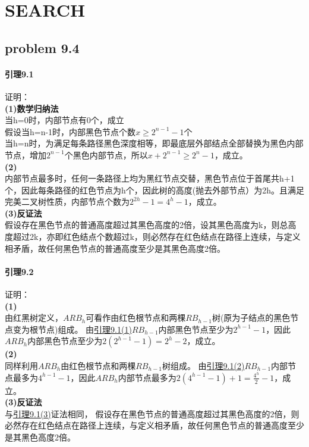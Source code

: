 \documentclass[11pt]{ctexart}
\begin{document}
	\section*{SEARCH}
	\subsection*{problem 9.4}
	\paragraph{引理9.1}证明：\\
	\hypertarget{9.1 (1)}{
	\textbf{(1)数学归纳法}}\\
	当h=0时，内部节点有0个，成立\\
	假设当h=n-1时，内部黑色节点个数$x\geq 2^{n-1}-1$个\\
	当h=n时，为满足每条路径黑色深度相等，即最底层外部结点全部替换为黑色内部节点，增加$2^{n-1}$个黑色内部节点，所以$x+2^{n-1}\geq2^{n}-1$，成立。\\
	\hypertarget{9.1 (2)}{\textbf{(2)}}\\
	内部节点最多时，任何一条路径上均为黑红节点交替，黑色节点位于首尾共h+1个，因此每条路径的红色节点为h个，因此树的高度(抛去外部节点）为2h。且满足完美二叉树性质，内部节点个数为$2^{2h}-1=4^h-1$，成立。\\
	\hypertarget{9.1 (2)}{\textbf{(3)反证法}}\\
	假设存在黑色节点的普通高度超过其黑色高度的2倍，设其黑色高度为k，则总高度超过2k，亦即红色结点个数超过k，则必然存在红色结点在路径上连续，与定义相矛盾，故任何黑色节点的普通高度至少是其黑色高度2倍。
	\paragraph{引理9.2}证明：\\
	\textbf{(1)}\\
	由红黑树定义，$ARB_h$可看作由红色根节点和两棵$RB_{h-1}$树(原为子结点的黑色节点变为根节点)组成。
	由\hyperlink{9.1 (1)}{引理9.1(1)}$RB_{h-1}$内部黑色节点至少为$2^{h-1}-1$，因此$ARB_h$内部黑色节点至少为$2(2^{h-1}-1)=2^h-2$，成立。\\
	\textbf{(2)}\\
	同样利用$ARB_h$由红色根节点和两棵$RB_{h-1}$树组成。
	由\hyperlink{9.1 (2)}{引理9.1(2)}$RB_{h-1}$内部节点最多为$4^{h-1}-1$，因此$ARB_h$内部节点最多为$2(4^{h-1}-1)+1=\frac{4^h}{2}-1$，成立。\\
	\textbf{(3)反证法}\\
	与\hyperlink{9.1 (3)}{引理9.1(3)}证法相同，
	假设存在黑色节点的普通高度超过其黑色高度的2倍，则必然存在红色结点在路径上连续，与定义相矛盾，故任何黑色节点的普通高度至少是其黑色高度2倍。
\end{document}
